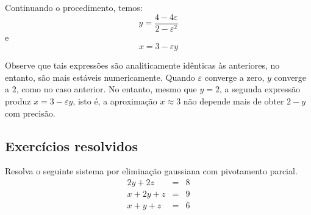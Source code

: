 \begin{sol}
Continuando o procedimento, temos:
$$y=\frac{4-4\varepsilon}{2-\varepsilon^2}$$ e
$$x=3-\varepsilon y$$

Observe que tais expressões são analiticamente idênticas às anteriores, no entanto, são mais estáveis numericamente. Quando $\varepsilon$ converge a zero, $y$ converge a $2$, como no caso anterior. No entanto, mesmo que $y=2$, a segunda expressão produz $x=3-\varepsilon y$, isto é, a aproximação $x\approx 3$ não depende mais de obter $2-y$ com precisão.
\end{sol}

\subsection*{Exercícios resolvidos}

\begin{exeresol}
Resolva o seguinte sistema por eliminação gaussiana com pivotamento parcial.
\begin{eqnarray*}
  2y + 2z &=& 8\\
  x + 2y + z &=& 9\\
  x + y + z &=& 6
\end{eqnarray*}
\end{exeresol}
